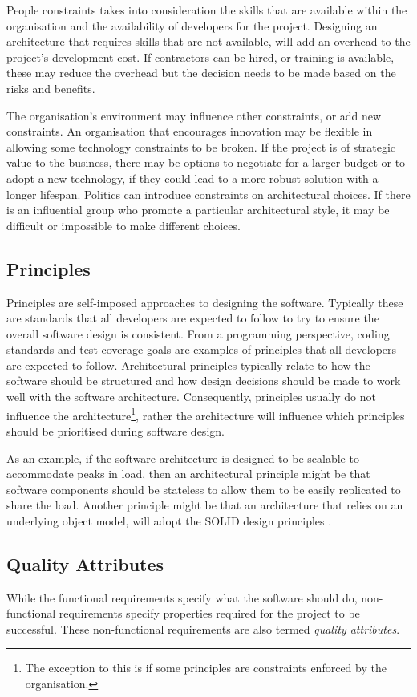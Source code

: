 People constraints takes into consideration the skills that are available within the organisation and the availability of developers for the project.
Designing an architecture that requires skills that are not available, will add an overhead to the project's development cost.
If contractors can be hired, or training is available, these may reduce the overhead but the decision needs to be made based on the risks and benefits.

The organisation's environment may influence other constraints, or add new constraints.
An organisation that encourages innovation may be flexible in allowing some technology constraints to be broken.
If the project is of strategic value to the business, there may be options to negotiate for a larger budget or to adopt
a new technology, if they could lead to a more robust solution with a longer lifespan.
Politics can introduce constraints on architectural choices.
If there is an influential group who promote a particular architectural style, it may be difficult or impossible to make different choices.

\subsection{Principles}
Principles are self-imposed approaches to designing the software.
Typically these are standards that all developers are expected to follow to try to ensure the overall software design is consistent.
From a programming perspective, coding standards and test coverage goals are examples of principles that all developers are expected to follow.
Architectural principles typically relate to how the software should be structured and how design decisions should be made to work well with the software architecture.
Consequently, principles usually do not influence the architecture\footnote{The exception to this is if some principles are constraints enforced by the organisation.},
rather the architecture will influence which principles should be prioritised during software design.

As an example, if the software architecture is designed to be scalable to accommodate peaks in load,
then an architectural principle might be that software components should be stateless to allow them to be easily replicated to share the load.
Another principle might be that an architecture that relies on an underlying object model, will adopt the SOLID design principles \cite{martin-principles-patterns}.

\subsection{Quality Attributes}
While the functional requirements specify what the software should do,
non-functional requirements specify properties required for the project to be successful.
These non-functional requirements are also termed \emph{quality attributes}.

